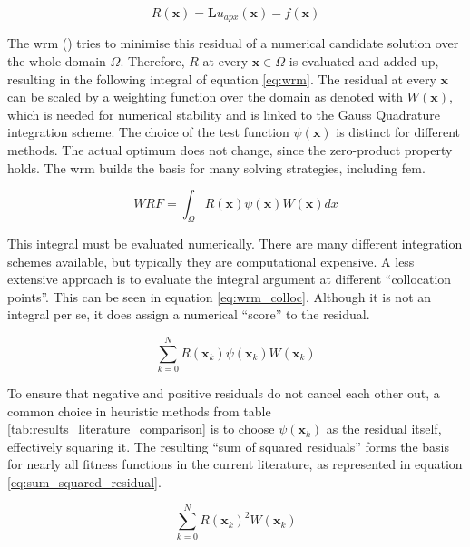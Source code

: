 \documentclass[./\jobname.tex]{subfiles}
\begin{document}
\begin{equation}
\label{eq:residual}
R(\mathbf{x}) = \mathbf{L}u_{apx}(\mathbf{x}) - f(\mathbf{x})
\end{equation}

The \gls{wrm} (\cite{shen_spectral_2011}) tries to minimise this residual of a numerical candidate solution over the whole domain $\Omega$. Therefore, $R$ at every $\mathbf{x} \in \Omega$ is evaluated and added up, resulting in the following integral of equation \eqref{eq:wrm}. The residual at every $\mathbf{x}$ can be scaled by a weighting function over the domain as denoted with $W(\mathbf{x})$, which is needed for numerical stability and is linked to the Gauss Quadrature integration scheme. The choice of the test function $\psi(\mathbf{x})$ is distinct for different methods. The actual optimum does not change, since the zero-product property holds. The \gls{wrm} builds the basis for many solving strategies, including \gls{fem}. 

\begin{equation}
\label{eq:wrm}
WRF = \int_{\Omega} R(\mathbf{x}) \psi(\mathbf{x}) W(\mathbf{x}) dx
\end{equation}

This integral must be evaluated numerically. There are many different integration schemes available, but typically they are computational expensive. A less extensive approach is to evaluate the integral argument at different ``collocation points''. This can be seen in equation \eqref{eq:wrm_colloc}. Although it is not an integral per se, it does assign a numerical ``score'' to the residual. 

\begin{equation}
\label{eq:wrm_colloc}
\sum_{k=0}^{N} R(\mathbf{x}_k) \psi(\mathbf{x}_k) W(\mathbf{x}_k)
\end{equation}

To ensure that negative and positive residuals do not cancel each other out, a common choice in heuristic methods from table \ref{tab:results_literature_comparison} is to choose $\psi(\mathbf{x}_k)$ as the residual itself, effectively squaring it. The resulting ``sum of squared residuals'' forms the basis for nearly all fitness functions in the current literature, as represented in equation \eqref{eq:sum_squared_residual}.

\begin{equation}
\label{eq:sum_squared_residual}
\sum_{k=0}^{N} R(\mathbf{x}_k)^2 W(\mathbf{x}_k)
\end{equation}
\end{document}
